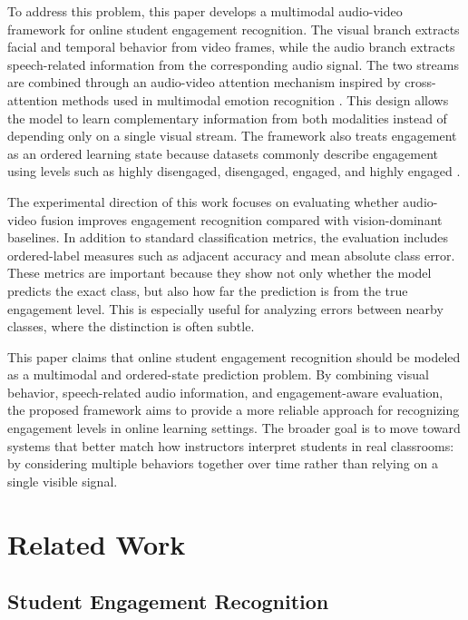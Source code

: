 \documentclass[journal]{IEEEtran}
\begin{document}
To address this problem, this paper develops a multimodal audio-video framework for online student engagement recognition. The visual branch extracts facial and temporal behavior from video frames, while the audio branch extracts speech-related information from the corresponding audio signal. The two streams are combined through an audio-video attention mechanism inspired by cross-attention methods used in multimodal emotion recognition \cite{venkatraman2025avtca}. This design allows the model to learn complementary information from both modalities instead of depending only on a single visual stream. The framework also treats engagement as an ordered learning state because datasets commonly describe engagement using levels such as highly disengaged, disengaged, engaged, and highly engaged \cite{wu2024cmose,tran2026ordinal}.

The experimental direction of this work focuses on evaluating whether audio-video fusion improves engagement recognition compared with vision-dominant baselines. In addition to standard classification metrics, the evaluation includes ordered-label measures such as adjacent accuracy and mean absolute class error. These metrics are important because they show not only whether the model predicts the exact class, but also how far the prediction is from the true engagement level. This is especially useful for analyzing errors between nearby classes, where the distinction is often subtle.

This paper claims that online student engagement recognition should be modeled as a multimodal and ordered-state prediction problem. By combining visual behavior, speech-related audio information, and engagement-aware evaluation, the proposed framework aims to provide a more reliable approach for recognizing engagement levels in online learning settings. The broader goal is to move toward systems that better match how instructors interpret students in real classrooms: by considering multiple behaviors together over time rather than relying on a single visible signal.

\section{Related Work}

\subsection{Student Engagement Recognition}
\end{document}
